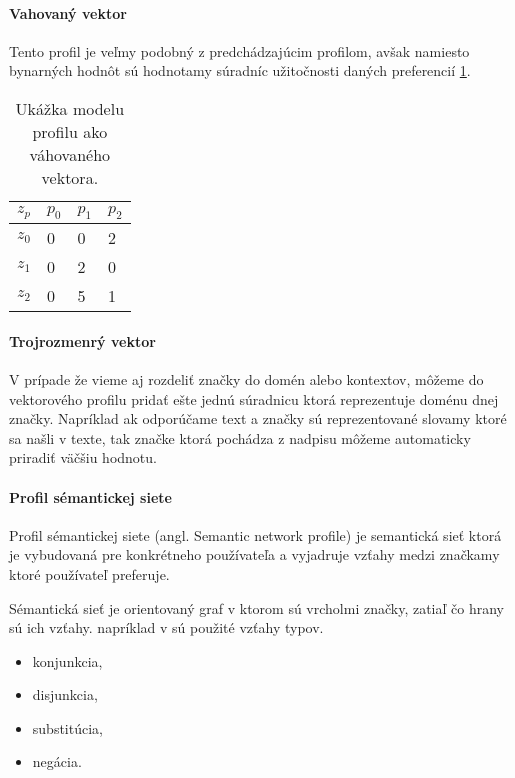 \paragraph{Vahovaný vektor}

Tento profil je veľmy podobný z predchádzajúcim profilom, avšak namiesto bynarných 
hodnôt sú hodnotamy súradníc užitočnosti daných preferencií \ref{table:weightprofile}.

\begin{table}[h]
\begin{center}
\begin{tabular}{|l|l|l|l|}
\hline
\(z_p\)  & \(p_0\) & \(p_1\) & \(p_2\) \\ \hline
\(z_0\) & 0     & 0        & 2        \\ \hline
\(z_1\) & 0     & 2        & 0        \\ \hline
\(z_2\) & 0     & 5        & 1        \\ \hline
\end{tabular}
\end{center}
\caption{Ukážka modelu profilu ako váhovaného vektora.}
\label{table:weightprofile}
\end{table}

\paragraph{Trojrozmenrý vektor}

V prípade že vieme aj rozdeliť značky do domén alebo kontextov,
môžeme do vektorového profilu pridať ešte jednú súradnicu ktorá reprezentuje
doménu dnej značky. Napríklad ak odporúčame text a značky sú
reprezentované slovamy ktoré sa našli v texte, tak značke ktorá pochádza 
z nadpisu môžeme automaticky priradiť väčšiu hodnotu.

\paragraph{Profil sémantickej siete}

Profil sémantickej siete (angl. Semantic network profile) je semantická sieť
ktorá je vybudovaná pre konkrétneho používateľa a vyjadruje vzťahy medzi značkamy
ktoré používateľ preferuje.


Sémantická sieť\cite{semantic_networks} je orientovaný graf v ktorom sú vrcholmi značky,
zatiaľ čo hrany sú ich vzťahy.
napríklad v \cite{basic_user_profiles} sú použité vzťahy typov.

\begin{itemize}
\item{konjunkcia,}
\item{disjunkcia,}
\item{substitúcia,}
\item{negácia.}
\end{itemize}

